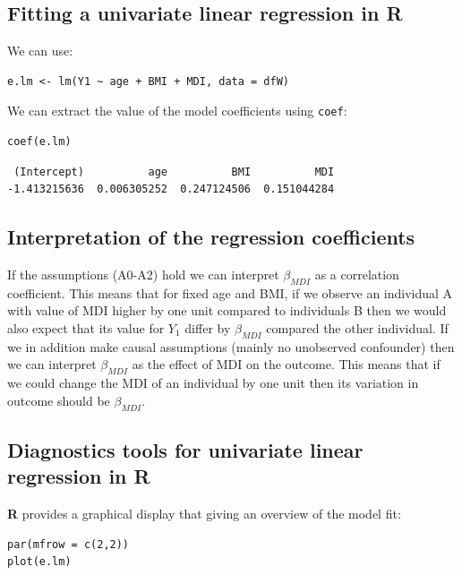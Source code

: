 \documentclass{article}
\newcommand\Rlogo{\textbf{\textsf{R}}}
\begin{document}
\subsection{Fitting a univariate linear regression in \Rlogo{}}
\label{sec:org0163929}

We can use:
\lstset{language=r,label= ,caption= ,captionpos=b,numbers=none}
\begin{lstlisting}
e.lm <- lm(Y1 ~ age + BMI + MDI, data = dfW)
\end{lstlisting}

We can extract the value of the model coefficients using \texttt{coef}:
\lstset{language=r,label= ,caption= ,captionpos=b,numbers=none}
\begin{lstlisting}
coef(e.lm)
\end{lstlisting}

\begin{verbatim}
 (Intercept)          age          BMI          MDI 
-1.413215636  0.006305252  0.247124506  0.151044284
\end{verbatim}

\subsection{Interpretation of the regression coefficients}
\label{sec:interpretationLM}
If the assumptions (A0-A2) hold we can interpret \(\beta_{MDI}\) as a
correlation coefficient. This means that for fixed age and BMI, if we
observe an individual A with value of MDI higher by one unit compared
to individuals B then we would also expect that its value for \(Y_1\)
differ by \(\beta_{MDI}\) compared the other individual. If we in
addition make causal assumptions (mainly no unobserved confounder)
then we can interpret \(\beta_{MDI}\) as the effect of MDI on the
outcome. This means that if we could change the MDI of an individual
by one unit then its variation in outcome should be \(\beta_{MDI}\).

\clearpage

\subsection{Diagnostics tools for univariate linear regression in \Rlogo{}}
\label{sec:diagLM}
\Rlogo{} provides a graphical display that giving an overview of the
model fit:
\lstset{language=r,label= ,caption= ,captionpos=b,numbers=none}
\begin{lstlisting}
par(mfrow = c(2,2))
plot(e.lm)
\end{lstlisting}
\end{document}
